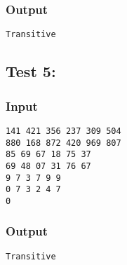 \documentclass[twocolumn,9pt]{extarticle}
\begin{document}
\subsubsection*{Output}
\texttt{Transitive}
 
\subsection*{Test 5:}
\subsubsection*{Input}
\texttt{141 421 356 237 309 504\\
880 168 872 420 969 807\\
85 69 67 18 75 37\\
69 48 07 31 76 67\\
9 7 3 7 9 9\\
0 7 3 2 4 7\\
0}
 
\subsubsection*{Output}
\texttt{Transitive}
\end{document}
